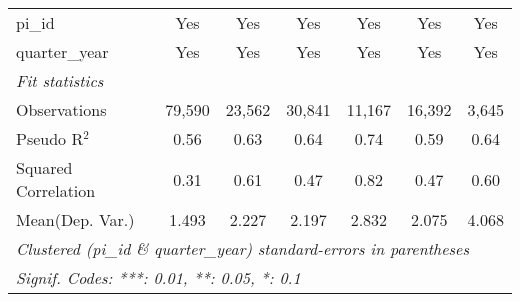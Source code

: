 \begin{tabular}{lcccccc}
   pi\_id                                                     & Yes           & Yes           & Yes           & Yes           & Yes           & Yes\\  
   quarter\_year                                              & Yes           & Yes           & Yes           & Yes           & Yes           & Yes\\  
   \midrule
   \emph{Fit statistics}\\
   Observations                                               & 79,590        & 23,562        & 30,841        & 11,167        & 16,392        & 3,645\\  
   Pseudo R$^2$                                               & 0.56          & 0.63          & 0.64          & 0.74          & 0.59          & 0.64\\  
   Squared Correlation                                        & 0.31          & 0.61          & 0.47          & 0.82          & 0.47          & 0.60\\  
Mean(Dep. Var.) & 1.493 & 2.227 & 2.197 & 2.832 & 2.075 & 4.068 \\
   \midrule \midrule
   \multicolumn{7}{l}{\emph{Clustered (pi\_id \& quarter\_year) standard-errors in parentheses}}\\
   \multicolumn{7}{l}{\emph{Signif. Codes: ***: 0.01, **: 0.05, *: 0.1}}\\
\end{tabular}
\par\endgroup
